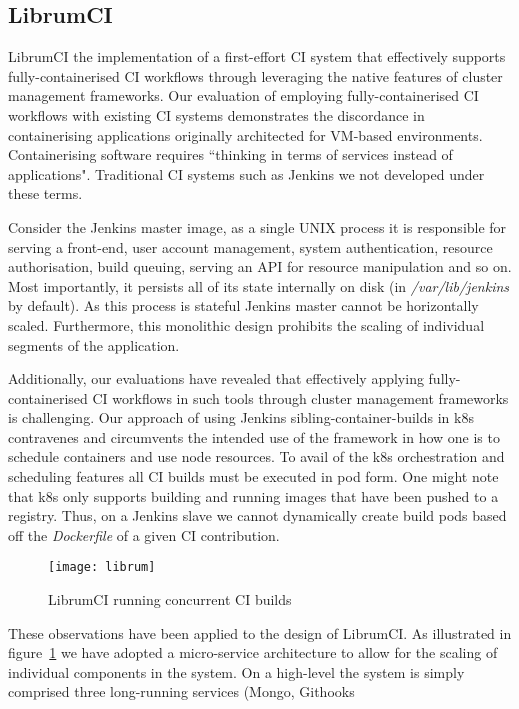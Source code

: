 \documentclass[journal]{IEEEtran}
\begin{document}
\subsection{LibrumCI}
LibrumCI the implementation of a first-effort CI system that
effectively supports fully-containerised CI workflows
through leveraging the native features of cluster 
management frameworks. Our evaluation of employing
fully-containerised CI workflows with existing CI systems
demonstrates the discordance in containerising applications originally architected for 
VM-based environments. Containerising software
requires ``thinking in terms of services instead
of applications". Traditional CI systems such as Jenkins
we not developed under these terms.
\par 
Consider the Jenkins master image, as a single UNIX process
it is responsible for serving a front-end, user account management,
system authentication, resource authorisation, build queuing, 
serving an API for resource manipulation
and so on. Most importantly, it persists all of its state internally on disk (in \textit{/var/lib/jenkins} by default).
As this process is stateful Jenkins master cannot be horizontally scaled. Furthermore,
this monolithic design prohibits the scaling of individual segments of the application. 
\par
Additionally, our evaluations have revealed that effectively
applying fully-containerised CI workflows in such tools through 
cluster management frameworks is challenging. Our approach
of using Jenkins sibling-container-builds in k8s contravenes 
and circumvents the intended use of the framework in how one is to 
schedule containers and use node resources. To avail of 
the k8s orchestration and scheduling features all
CI builds must be executed in pod form. One might note that
k8s only supports building and running images that have been pushed
to a registry. Thus, on a Jenkins slave we cannot dynamically create 
build pods based off the \textit{Dockerfile} of a given CI contribution.
\begin{figure}[htp]
      \centering
      \texttt{[image: librum]}
      \caption{LibrumCI running concurrent CI builds} 
      \label{fig:librum}
\end{figure}
\par
These observations have been applied to the design of LibrumCI. As illustrated in figure~\ref{fig:librum}
we have adopted a micro-service architecture to allow for the 
scaling of individual components in the system. On a high-level
the system is simply comprised three long-running services (Mongo, Githooks
\end{document}
